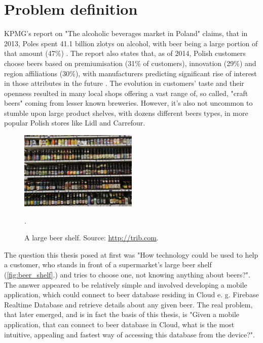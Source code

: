 \documentclass[11pt]{article}
\begin{document}
\thispagestyle{empty}
\tableofcontents
\clearpage
\setcounter{page}{1}

\section{Problem definition}
KPMG's report on "The alcoholic beverages market in Poland" claims, that in 2013, Poles spent 41.1 billion zlotys on alcohol, with beer being a large portion of that amount (47\%) \cite{kpmg_alco}. The report also states that, as of 2014, Polish customers choose beers based on premiumisation (31\% of customers), innovation (29\%) and region affiliations (30\%), with manufacturers predicting significant rise of interest in those attributes in the future \cite{kpmg_alco}. The evolution in customers' taste and their openness resulted in many local shops offering a vast range of, so called, "craft beers" coming from lesser known breweries. However, it's also not uncommon to stumble upon large product shelves, with dozens different beers types, in more popular Polish stores like Lidl and Carrefour.\\

\begin{figure}[h]
\includegraphics[width=0.5\textwidth]{beer_shelf}
\centering
\caption{A large beer shelf. Source: \protect \url{http://trib.com}.}.
\label{fig:beer_shelf}
\end{figure}

The question this thesis posed at first was "How technology could be used to help a customer, who stands in front of a supermarket's large beer shelf (\autoref{fig:beer_shelf}.) and tries to choose one, not knowing anything about beers?". The answer appeared to be relatively simple and involved developing a mobile application, which could connect to beer database residing in Cloud e. g. Firebase Realtime Database and retrieve details about any given beer. The real problem, that later emerged, and is in fact the basis of this thesis, is "Given a mobile application, that can connect to beer database in Cloud, what is the most intuitive, appealing and fastest way of accessing this database from the device?".
\clearpage
\end{document}

